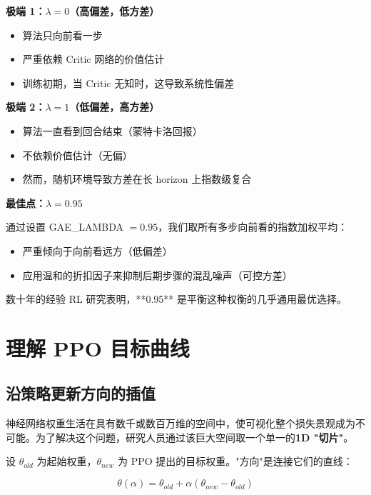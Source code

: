 \documentclass[12pt,a4paper]{article}
\theoremstyle{noteplain}
\theoremstyle{noteexercise}
\begin{document}
\textbf{极端 1：$\lambda = 0$（高偏差，低方差）}
\begin{itemize}
  \setlength{\itemsep}{0.2em}
  \item 算法只向前看一步
  \item 严重依赖 Critic 网络的价值估计
  \item 训练初期，当 Critic 无知时，这导致系统性偏差
\end{itemize}

\textbf{极端 2：$\lambda = 1$（低偏差，高方差）}
\begin{itemize}
  \setlength{\itemsep}{0.2em}
  \item 算法一直看到回合结束（蒙特卡洛回报）
  \item 不依赖价值估计（无偏）
  \item 然而，随机环境导致方差在长 horizon 上指数级复合
\end{itemize}

\textbf{最佳点：$\lambda = 0.95$}

通过设置 GAE\_LAMBDA $= 0.95$，我们取所有多步向前看的指数加权平均：
\begin{itemize}
  \setlength{\itemsep}{0.2em}
  \item 严重倾向于向前看远方（低偏差）
  \item 应用温和的折扣因子来抑制后期步骤的混乱噪声（可控方差）
\end{itemize}

数十年的经验 RL 研究表明，**0.95** 是平衡这种权衡的几乎通用最优选择。

\section{理解 PPO 目标曲线}\label{sec:curve}

\subsection{沿策略更新方向的插值}

神经网络权重生活在具有数千或数百万维的空间中，使可视化整个损失景观成为不可能。为了解决这个问题，研究人员通过该巨大空间取一个单一的\textbf{1D "切片"}。

设 $\theta_{old}$ 为起始权重，$\theta_{new}$ 为 PPO 提出的目标权重。"方向"是连接它们的直线：

\begin{equation}\label{eq:interpolation}
  \theta(\alpha) = \theta_{old} + \alpha(\theta_{new} - \theta_{old})
\end{equation}
\end{document}
